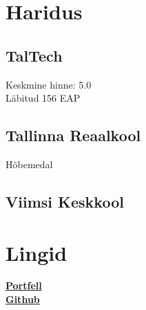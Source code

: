 \documentclass[letterpaper]{deedy-resume} %
\begin{document}
\begin{minipage}[t]{0.33\textwidth} %


\section{Haridus}

\subsection{TalTech}

Keskmine hinne: 5.0 \\
Läbitud 156 EAP


\sectionspace %

\subsection{Tallinna Reaalkool}

Hõbemedal

\sectionspace %

\subsection{Viimsi Keskkool}

\sectionspace %


\section{Lingid}

\href{https://susiik.github.io/}{\bf Portfell} \\
\href{https://github.com/susIik}{\bf Github} \\

\sectionspace %



\end{minipage}
\end{document}
